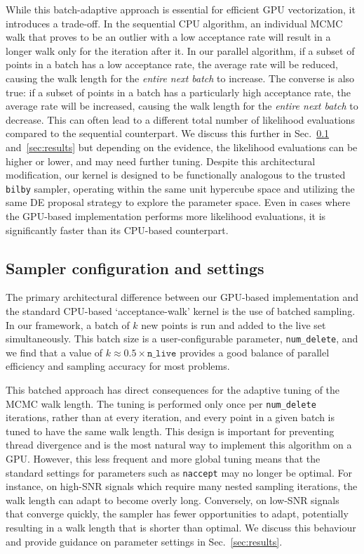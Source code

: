 \documentclass[fleqn,usenatbib]{mnras}
\begin{document}
While this batch-adaptive approach is essential for efficient GPU
vectorization, it introduces a trade-off. In the sequential CPU
algorithm, an individual MCMC walk that proves to be an outlier with a low acceptance rate
will result in a longer walk only for the iteration after it. In our parallel algorithm, if a subset of points
in a batch has a low acceptance rate, the average rate will be reduced,
causing the walk length for the \textit{entire next batch} to increase. 
The converse is also true: if a subset of points in a batch has a particularly high acceptance rate,
the average rate will be increased, causing the walk length for the \textit{entire next batch} to decrease.
This can often lead to a different total number of likelihood
evaluations compared to the sequential counterpart. We discuss this further in Sec.~\ref{sec:sampler_config} 
and~\ref{sec:results}
but depending on the evidence, the likelihood evaluations can be higher or lower, and 
may need further tuning.
Despite this architectural modification, our kernel is designed to be functionally
analogous to the trusted \texttt{bilby} sampler, operating within the
same unit hypercube space and utilizing the same DE proposal strategy
to explore the parameter space. Even in cases where
the GPU-based implementation performs more likelihood evaluations,
it is significantly faster than its CPU-based counterpart.

\subsection{Sampler configuration and settings}
\label{sec:sampler_config}

The primary architectural difference between our GPU-based implementation
and the standard CPU-based `acceptance-walk' kernel is the use of
batched sampling. In our framework, a batch of $k$ new points is
run and added to the live set simultaneously. This batch size is
a user-configurable parameter, \texttt{num\_delete}, and we find that a
value of $k \approx 0.5 \times \texttt{n\_live}$ provides a good balance
of parallel efficiency and sampling accuracy for most problems.

This batched approach has direct consequences for the adaptive tuning of
the MCMC walk length. The tuning is performed only once per \texttt{num\_delete} iterations, 
rather than at every iteration, and every point in a given batch is tuned to have the same walk length. 
This design is important for preventing thread divergence and is the 
most natural way to implement this algorithm on a GPU.
However, this less frequent and more global tuning means that the standard settings for
parameters such as \texttt{naccept} may no longer be optimal. For
instance, on high-SNR signals which require many nested sampling
iterations, the walk length can adapt to become overly long.
Conversely, on low-SNR signals that converge quickly, the sampler has
fewer opportunities to adapt, potentially resulting in a walk length
that is shorter than optimal. We discuss this behaviour and provide
guidance on parameter settings in Sec.~\ref{sec:results}.
\end{document}
